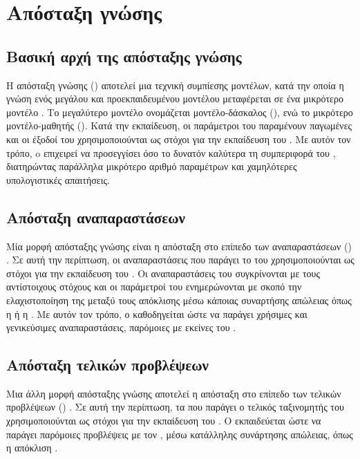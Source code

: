 \section{Απόσταξη γνώσης}
\label{sec:knowledge-distillation}

\subsection{Βασική αρχή της απόσταξης γνώσης}
\label{subsec:knowledge-distillation}

Η απόσταξη γνώσης () 
αποτελεί μια τεχνική συμπίεσης μοντέλων, κατά την οποία η γνώση ενός
μεγάλου και προεκπαιδευμένου μοντέλου μεταφέρεται σε ένα μικρότερο
μοντέλο \cite{hinton2015distilling}. Το μεγαλύτερο
μοντέλο ονομάζεται μοντέλο-δάσκαλος (), ενώ το μικρότερο 
μοντέλο-μαθητής (). Κατά την εκπαίδευση, οι παράμετροι του  
παραμένουν παγωμένες και οι έξοδοί του χρησιμοποιούνται ως στόχοι για την εκπαίδευση του
. Με αυτόν τον τρόπο, o  επιχειρεί να προσεγγίσει όσο το δυνατόν καλύτερα
τη συμπεριφορά του , διατηρώντας παράλληλα μικρότερο αριθμό
παραμέτρων και χαμηλότερες υπολογιστικές απαιτήσεις.

\subsection{Απόσταξη αναπαραστάσεων}
\label{subsec:feature-distillation}

Μία μορφή απόσταξης γνώσης είναι η απόσταξη στο επίπεδο των αναπαραστάσεων
() \cite{romero2015fitnets}. Σε αυτή την περίπτωση, οι αναπαραστάσεις που
παράγει το  του  χρησιμοποιούνται ως στόχοι για την
εκπαίδευση του . Οι αναπαραστάσεις του 
συγκρίνονται με τους αντίστοιχους στόχους και οι παράμετροί του
ενημερώνονται με σκοπό την ελαχιστοποίηση της μεταξύ τους απόκλισης
μέσω κάποιας συναρτήσης απώλειας όπως η  ή η . 
Με αυτόν τον τρόπο, ο  καθοδηγείται ώστε να παράγει χρήσιμες και γενικεύσιμες
αναπαραστάσεις, παρόμοιες με εκείνες του .

\subsection{Απόσταξη τελικών προβλέψεων}
\label{subsec:logit-distillation}

Μια άλλη μορφή απόσταξης γνώσης αποτελεί η απόσταξη στο επίπεδο των τελικών
προβλέψεων () \cite{beyer2022knowledge}. Σε αυτή την περίπτωση, τα 
που παράγει ο τελικός ταξινομητής του  χρησιμοποιούνται ως
στόχοι για την εκπαίδευση του . Ο  εκπαιδεύεται
ώστε να παράγει παρόμοιες προβλέψεις με τον , μέσω κατάλληλης
συνάρτησης απώλειας, όπως η απόκλιση .

